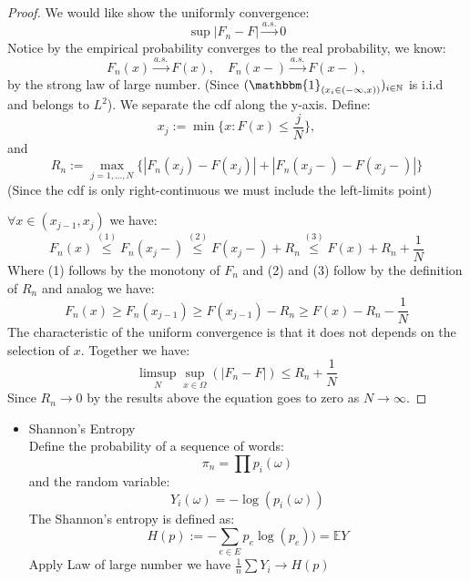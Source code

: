 \documentclass[a4paper,11pt]{article}
\theoremstyle{definition}
\theoremstyle{remark}
\begin{document}
\begin{proof}
	We would like show the uniformly convergence:
\begin{equation}
	\sup |F_n - F| \overset{a.s.	}{\longrightarrow} 0
\end{equation}
 Notice by the empirical probability converges to the real probability, we know:
\begin{equation*}
	F_n(x) \overset{a.s.}{\longrightarrow} F(x), \quad F_n(x-) \overset{a.s.}{\longrightarrow} F(x-), 
\end{equation*}
by the strong law of large number. (Since $(\mathbbm{1}_{(x_i \in (- \infty, x))})_{i \in \mathbb{N}}$ is i.i.d and belongs to $L^2$). We separate the cdf along the y-axis. Define:
\begin{equation}
	x_j := \min \{x : F(x) \leq \frac{j}{N}\}, 
\end{equation}
and
\begin{equation}
	R_n := \max_{j = 1, \dots, N}\{ |F_n(x_j) - F(x_j)| + |F_n(x_j-) - F(x_j-)| \}
\end{equation}
(Since the cdf is only right-continuous we must include the left-limits point)

$\forall x \in (x_{j - 1}, x_j)$ we have:
\begin{equation*}
	F_n(x) \overset{(1)}{\leq} F_n(x_{j}-) \overset{(2)}{\leq} F(x_j-) + R_n \overset{(3)}{\leq} F(x) + R_n + \frac{1}{N} 
\end{equation*}
Where (1) follows by the monotony of $F_n$ and (2) and (3) follow by the definition of $R_n$ and analog we have:
\begin{equation*}
	F_n(x) \geq F_n (x_{j -1}) \geq F(x_{j - 1}) - R_n \geq F(x) - R_n - \frac{1}{N}
\end{equation*}
The characteristic of the uniform convergence is that it does not depends on the selection of $x$. 
Together we have:
\begin{equation}
	\limsup_N \sup_{x \in \Omega}(|F_n - F|) \leq R_n + \frac{1}{N}
\end{equation}
Since $R_n \longrightarrow 0$ by the results above the equation goes to zero as $N \longrightarrow \infty$.
\end{proof}



\begin{itemize}
\color{red}
	\item Shannon's Entropy\\
	Define the probability of a sequence of words:
	\begin{equation*}
		\pi_n = \prod p_i(\omega)
	\end{equation*}
	and the random variable:
	\begin{equation*}
		Y_i(\omega) = -\log(p_i(\omega))
	\end{equation*}
	The Shannon's entropy is defined as:
	\begin{equation*}
		H(p) := -\sum_{e \in E} p_e \log (p_e)) = \mathbb{E}Y
	\end{equation*}
	Apply Law of large number we have $\frac{1}{n} \sum Y_i \longrightarrow H(p)$
\end{itemize}
\end{document}
